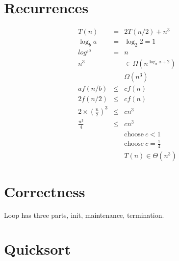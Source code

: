 \documentclass{article}
\begin{document}
\setcounter{section}{3}
\section{Recurrences}
\begin{eqnarray}
T(n) & = & 2T(n/2) + n^3 \\
\log_b a & = & \log _2 2 = 1 \\
log ^{_b a} & = & n \\
n^3 & & \in  \Omega (n^{\log _b a + 2}) \\
& & \Omega(n^3) \\
af(n / b) & \leq & cf(n) \\
2f(n/2) & \leq & cf(n) \\
2 \times (\frac{n}{2})^3 & \leq & cn^3 \\
\frac{n^3}{4} & \leq & c n^3 \\
& & \text{choose} \ c < 1\\
& & \text{choose} \ c = \frac{1}{4} \\
& & T(n) \in \Theta(n^3)
\end{eqnarray}

\section{Correctness}
Loop has three parts, init, maintenance, termination.

\section{Quicksort}
\end{document}
